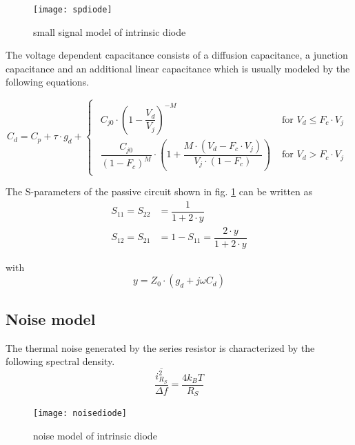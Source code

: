 \documentclass[10pt]{report}
\begin{document}
\begin{figure}[ht]
\begin{center}
\texttt{[image: spdiode]}
\end{center}
\caption{small signal model of intrinsic diode}
\label{fig:spdiode}
\end{figure}
\FloatBarrier

The voltage dependent capacitance consists of a diffusion capacitance,
a junction capacitance and an additional linear capacitance which is
usually modeled by the following equations.

\begin{equation}
C_{d} = C_p + \tau \cdot g_{d} +
\begin{cases}
\begin{array}{ll}
C_{j0}\cdot \left(1 - \dfrac{V_{d}}{V_{j}}\right)^{-M} & \textrm{ for } V_{d} \le F_c\cdot V_j\\
\dfrac{C_{j0}}{\left(1 - F_c\right)^M}\cdot \left(1 + \dfrac{M\cdot \left(V_{d} - F_c\cdot V_j\right)}{V_{j}\cdot\left(1 - F_c\right)}\right) & \textrm{ for } V_{d} > F_c\cdot V_j
\end{array}
\end{cases}
\end{equation}

The S-parameters of the passive circuit shown in
fig. \ref{fig:spdiode} can be written as
\begin{align}
S_{11} = S_{22} &= \dfrac{1}{1 + 2\cdot y}\\
S_{12} = S_{21} &= 1 - S_{11} = \dfrac{2\cdot y}{1 + 2\cdot y}
\end{align}

with
\begin{equation}
y = Z_{0}\cdot \left(g_{d} + j\omega C_{d}\right)
\end{equation}

\subsection{Noise model}

The thermal noise generated by the series resistor is characterized by
the following spectral density.
\begin{equation}
\dfrac{\overline{i_{R_S}^2}}{\Delta f} = \dfrac{4 k_B T}{R_S}
\end{equation}

\begin{figure}[ht]
\begin{center}
\texttt{[image: noisediode]}
\end{center}
\caption{noise model of intrinsic diode}
\label{fig:noisediode}
\end{figure}
\FloatBarrier
\end{document}
